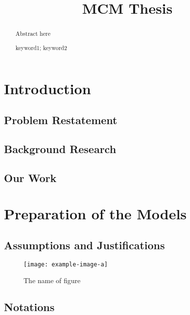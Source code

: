 \documentclass{mcmthesis}
\title{MCM Thesis}
\begin{document}
\begin{abstract}
  Abstract here

\cite{dynamics_of_a_new_SIR_epidemic_model}
\cite{sutton1980coelomycetes}
\begin{keywords}
keyword1; keyword2
\end{keywords}
\end{abstract}
\maketitle
\tableofcontents
\newpage

\section{Introduction}
\subsection{Problem Restatement}
\subsection{Background Research}
\subsection{Our Work}

\section{Preparation of the Models}
\subsection{Assumptions and Justifications}
\begin{figure}[h]
\small
\centering
\texttt{[image: example-image-a]}
\caption{The name of figure} \label{fig:aa}
\end{figure}
\subsection{Notations}
\end{document}
